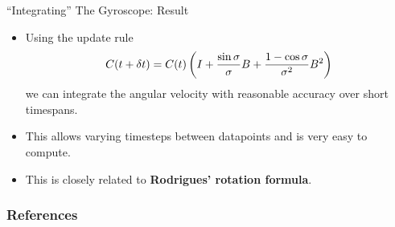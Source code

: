 \documentclass[10pt]{beamer}
\begin{document}
\begin{frame}{``Integrating'' The Gyroscope: Result}
  \begin{itemize}
  \item Using the update rule
    \[C(t + \delta t) = C(t)\del{I + \frac{\sin \sigma}{\sigma}B + \frac{1 - \cos\sigma}{\sigma^2}B^2}\]
    we can integrate the angular velocity with reasonable accuracy over short timespans.
  \item This allows varying timesteps between datapoints and is very easy to compute.
  \item This is closely related to \textbf{Rodrigues' rotation formula}.
  \end{itemize}
\end{frame}

\begin{frame}
\frametitle{References}


\end{frame}
\end{document}

